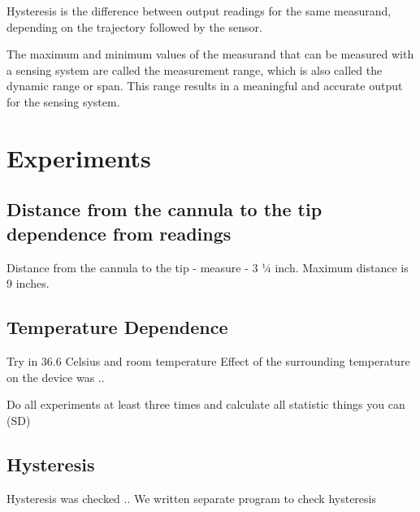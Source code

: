 Hysteresis is the difference between output readings for the same measurand, depending on the trajectory followed by the sensor.

The maximum and minimum values of the measurand that can be measured with a sensing system are called the measurement range, which is also called the dynamic range or span. This range results in a meaningful and accurate output for the sensing system. \cite{kalantar-zadeh_sensors_2013}

\section{Experiments}
\label{sec:Experims}

	\subsection{Distance from the cannula to the tip dependence from readings}
	\label{sec:DisExp}
	Distance from the cannula to the tip - measure - 3 ¼ inch. Maximum distance is 9 inches.


	\subsection{Temperature Dependence}
	\label{sec:TempExp}
	Try in 36.6 Celsius and room temperature
	Effect of the surrounding temperature on the device was ..

	Do all experiments at least three times and calculate all statistic things you can (SD)

	\subsection{Hysteresis}
	\label{sec:HystExp}
	Hysteresis was checked .. 
	We written separate program to check hysteresis





